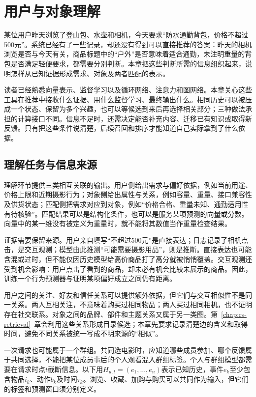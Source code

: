 \chapter{用户与对象理解}
\label{chap:rs-understanding}

某位用户昨天浏览了登山包、水壶和相机，今天要求“防水通勤背包，价格不超过500元”。系统已经有了一些记录，却还没有得到可以直接推荐的答案：昨天的相机浏览是否与今天有关，商品标题中的“户外”是否意味着适合通勤，未注明重量的背包是否满足轻便要求，都需要分别判断。本章把这些判断所需的信息组织起来，说明怎样从已知证据形成需求、对象及两者匹配的表示。

读者已经熟悉向量表示、监督学习以及循环网络、注意力和图网络。本章关心这些工具在推荐中接收什么证据、用什么监督学习、最终输出什么。相同历史可以被压成一个状态、保留为多个兴趣，也可以等候选到来后再选择相关部分；三种做法承担的计算接口不同。信息不足时，还需决定能否补充内容、迁移已有知识或取得新反馈。只有把这些条件说清楚，后续召回和排序才能知道自己实际拿到了什么依据。

\section{理解任务与信息来源}
\label{sec:rs-understanding-evidence}

理解环节提供三类相互关联的输出。用户侧给出需求与偏好依据，例如当前用途、价格上限和近期摄影行为；对象侧给出属性与关系，例如容量、重量、接口兼容性及供货状态；匹配侧把需求对应到对象，例如“价格合格、重量未知、通勤适用性有待核验”。匹配结果可以是结构化条件，也可以是服务某项预测的向量或分数。向量中的某一维没有被定义为重量时，就不能将其数值当作重量检查结果。

证据需要保留来源。用户亲自填写“不超过500元”是直接表达；日志记录了相机点击，是交互观测；模型由此推测“可能需要摄影用品”，则是推断。直接表达也可能含混或过时，但不能仅因历史模型给高价商品打了高分就被悄悄覆盖。交互观测还受到机会影响：用户点击了看到的商品，却未必有机会比较未展示的商品。因此，训练一个行为预测器与证明某项偏好成立之间仍有距离。

用户之间的关注、好友和信任关系可以提供额外依据，但它们与交互相似性不是同一关系。两人互相关注，不意味着购买过相同物品；两人买过相同相机，也不证明存在社交联系。对象之间的品牌、部件和主题关系又属于另一类图。第~\ref{chap:rs-retrieval}~章会利用这些关系形成目录候选；本章先要求记录清楚边的含义和取得时间，避免不同关系被统一写成不明来源的“相似”。

一次请求也可能属于一个群组。共同选电影时，应知道哪些成员参加、哪个反馈属于共同选择，不能把某位成员事后的个人观看混入群组标签。个人与群组模型都需要在请求时点$t$截断信息。以下用$H_{u,t}=(e_1,\ldots,e_n)$表示已知历史，事件$e_k$至少包含物品$i_k$、动作$b_k$及时间$\tau_k$。浏览、收藏、加购与购买可以共同作为输入，但它们的标签和预测窗口须分别定义。

